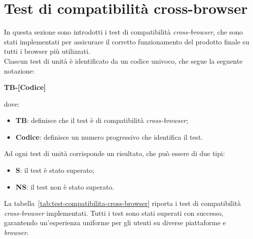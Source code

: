 \section{Test di compatibilità cross-browser}\label{sec:test-compatibilita-cross-browser}
In questa sezione sono introdotti i test di compatibilità \textit{cross-browser}, che sono stati implementati per assicurare il corretto funzionamento del prodotto finale su tutti i browser più utilizzati.\\
Ciascun test di unità è identificato da un codice univoco, che segue la seguente notazione:
\begin{center}
  \textbf{TB-[Codice]}
\end{center}
dove:
\begin{itemize}
  \item \textbf{TB}: definisce che il test è di compatibilità \textit{cross-browser};
  \item \textbf{Codice}: definisce un numero progressivo che identifica il test.
\end{itemize}
Ad ogni test di unità corrisponde un risultato, che può essere di due tipi:
\begin{itemize}
  \item \textbf{S}: il test è stato superato;
  \item \textbf{NS}: il test non è stato superato.
\end{itemize}
La tabella~\ref{tab:test-compatibilita-cross-browser} riporta i test di compatibilità \textit{cross-browser} implementati. Tutti i test sono stati superati con successo, garantendo un'esperienza uniforme per gli utenti su diverse piattaforme e \textit{browser}.

